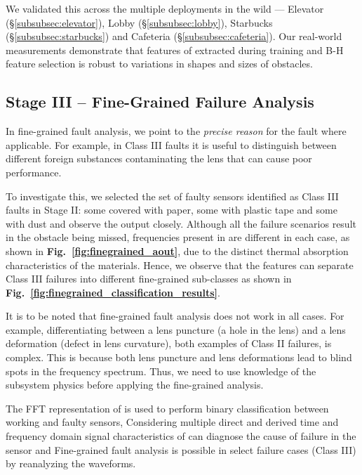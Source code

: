 We validated this across the multiple deployments in the wild --- Elevator (\S\ref{subsubsec:elevator}), Lobby (\S\ref{subsubsec:lobby}), Starbucks (\S\ref{subsubsec:starbucks}) and Cafeteria (\S\ref{subsubsec:cafeteria}).
Our real-world measurements demonstrate that features of \aout extracted during training and B-H feature selection is robust to variations in shapes and sizes of obstacles.



\subsection{Stage III -- Fine-Grained Failure Analysis} In fine-grained fault analysis, we point to the \textit{precise reason} for the fault where applicable. For example, in Class III faults it is useful to distinguish between different foreign substances contaminating the lens that can cause poor performance.


To investigate this, we selected the set of faulty sensors identified as Class III faults in 
Stage II: some covered with paper, some with plastic tape and some with dust and observe the \aout output closely. 
Although all the failure scenarios result in the obstacle being missed, frequencies present in \aout are different in each case, as shown in {\bfseries Fig.~\ref{fig:finegrained_aout}}, %
due to the distinct thermal absorption characteristics of the materials.
Hence, we observe that the \aout features can separate Class III failures into different fine-grained sub-classes as shown in {\bfseries Fig.~\ref{fig:finegrained_classification_results}}. 

It is to be noted that fine-grained fault analysis does not work in all cases.
For example, differentiating between a lens puncture (a hole in the lens) and a lens deformation (defect in lens curvature), both examples of Class II failures, is complex. 
This is because both lens puncture and lens deformations lead to blind spots in the frequency spectrum. 
Thus, we need to use knowledge of the subsystem physics before applying the fine-grained analysis.

 \ci The FFT representation of \aout is used to perform binary classification between working and faulty sensors, \cii Considering multiple direct and derived time and frequency domain signal characteristics of \aout can diagnose the cause of failure in the sensor and \ciii Fine-grained fault analysis is possible in select failure cases (\eg Class III) by reanalyzing the \aout waveforms. 


